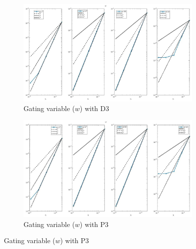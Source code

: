 \documentclass[a4paper,11pt]{article}
\begin{document}
\begin{figure}[H]
\caption{Comparison of the gating variable ($w$)}
\label{w_3}
\begin{subfigure}{\textwidth}
\begin{center}
\includegraphics[width = \textwidth]{./D3_w_1.jpg}
\caption{Gating variable ($w$) with D3}
\end{center}
\end{subfigure}
\begin{subfigure}{\textwidth}
\begin{center}
\includegraphics[width =\textwidth]{./P3_w_1.jpg}
\caption{Gating variable ($w$) with P3}
\end{center}
\end{subfigure}
\end{figure}
\restoregeometry
\newpage
\end{document}
